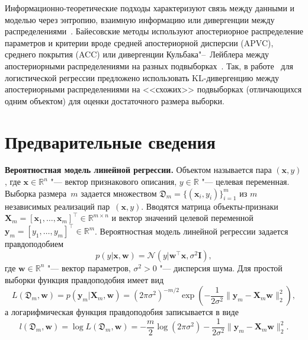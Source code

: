 
Информационно-теоретические подходы характеризуют связь между данными и моделью через энтропию, взаимную информацию или дивергенции между распределениями~. Байесовские методы используют апостериорное распределение параметров и критерии вроде средней апостериорной дисперсии (APVC), среднего покрытия (ACC) или дивергенции Кульбака"--~Лейблера между апостериорными распределениями на разных подвыборках~. Так, в работе~\cite{MOTRENKO2014743} для логистической регрессии предложено использовать KL-дивергенцию между апостериорными распределениями на <<схожих>> подвыборках (отличающихся одним объектом) для оценки достаточного размера выборки.

\section{Предварительные сведения}\label{sec:linear-preliminaries}

\textbf{Вероятностная модель линейной регрессии.} Объектом называется пара $(\mathbf{x}, y)$, где $\mathbf{x} \in \mathbb{R}^n$ "--- вектор признакового описания, $y \in \mathbb{R}$ "--- целевая переменная. Выборка размера~$m$ задается множеством $\mathfrak{D}_m = \{(\mathbf{x}_i, y_i)\}_{i=1}^m$ из $m$ независимых реализаций пар~$(\mathbf{x}, y)$. Вводятся матрица объекты-признаки $\mathbf{X}_m = \left[ \mathbf{x}_1, \ldots, \mathbf{x}_m \right]^\top \in \mathbb{R}^{m \times n}$ и вектор значений целевой переменной $\mathbf{y}_m = \left[ y_1, \ldots, y_m \right]^\top \in \mathbb{R}^{m}$. Вероятностная модель линейной регрессии задается правдоподобием
\begin{equation}
    \label{eq:linreg-likelihood}
    p(y | \mathbf{x}, \mathbf{w}) = \mathcal{N}(y | \mathbf{w}^\top \mathbf{x}, \sigma^2 \mathbf{I}),
\end{equation}
где $\mathbf{w} \in \mathbb{R}^n$ "--- вектор параметров, $\sigma^2 > 0$ "--- дисперсия шума. Для простой выборки функция правдоподобия имеет вид
\begin{equation}
    \label{eq:likelihood-full}
    L(\mathfrak{D}_m, \mathbf{w}) = p(\mathbf{y}_m | \mathbf{X}_m, \mathbf{w}) = (2\pi\sigma^2)^{-m/2} \exp\left(-\frac{1}{2\sigma^2} \|\mathbf{y}_m - \mathbf{X}_m \mathbf{w}\|_2^2\right),
\end{equation}
а логарифмическая функция правдоподобия записывается в виде
\begin{equation}
    \label{eq:loglikelihood}
    l(\mathfrak{D}_m, \mathbf{w}) = \log L(\mathfrak{D}_m, \mathbf{w}) = -\frac{m}{2}\log(2\pi\sigma^2) - \frac{1}{2\sigma^2} \|\mathbf{y}_m - \mathbf{X}_m \mathbf{w}\|_2^2.
\end{equation}

